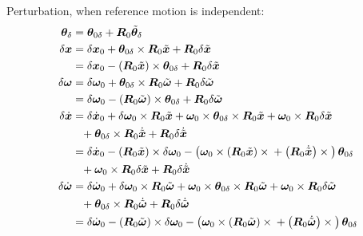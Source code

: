 \documentclass[10pt,fleqn,subeqn]{report}
\newcommand{\T}[1]{\bm{#1}}
\newcommand{\TT}[1]{\bm{#1}}
\begin{document}
Perturbation, when reference motion is independent:
\begin{subequations}
\begin{align}
	\T{\theta}_{\delta}
		&= \T{\theta}_{0\delta}
	+ \TT{R}_0 \tilde{\T{\theta}}_{\delta} \\
	\delta\T{x}
		&= \delta\T{x}_0
		+ \T{\theta}_{0\delta}\times\TT{R}_0 \tilde{\T{x}}
		+ \TT{R}_0 \delta\tilde{\T{x}}
		\nonumber \\
		&= \delta\T{x}_0
		- \plbr{\TT{R}_0 \tilde{\T{x}}} \times \T{\theta}_{0\delta}
		+ \TT{R}_0 \delta\tilde{\T{x}} \\
	\delta \T{\omega}
		&= \delta\T{\omega}_0
		+ \T{\theta}_{0\delta}\times\TT{R}_0 \tilde{\T{\omega}}
		+ \TT{R}_0 \delta\tilde{\T{\omega}}
		\nonumber \\
		&= \delta\T{\omega}_0
		- \plbr{\TT{R}_0 \tilde{\T{\omega}}} \times \T{\theta}_{0\delta}
		+ \TT{R}_0 \delta\tilde{\T{\omega}} \\
	\delta\dot{\T{x}}
		&= \delta\dot{\T{x}}_0
		+ \delta\T{\omega}_0 \times \TT{R}_0 \tilde{\T{x}}
		+ \T{\omega}_0 \times \T{\theta}_{0\delta}\times\TT{R}_0 \tilde{\T{x}}
		+ \T{\omega}_0 \times \TT{R}_0 \delta\tilde{\T{x}}
		\nonumber \\
		&\hphantom{=}+ \T{\theta}_{0\delta}\times\TT{R}_0 \dot{\tilde{\T{x}}}
		+ \TT{R}_0 \delta\dot{\tilde{\T{x}}}
		\nonumber \\
		&= \delta\dot{\T{x}}_0
		- \plbr{\TT{R}_0 \tilde{\T{x}}} \times \delta\T{\omega}_0
		- \plbr{
			\T{\omega}_0 \times \plbr{\TT{R}_0 \tilde{\T{x}}} \times{}
			+ \plbr{\TT{R}_0 \dot{\tilde{\T{x}}}}\times{}
		}\T{\theta}_{0\delta}
		\nonumber \\
		&\hphantom{=}+ \T{\omega}_0 \times \TT{R}_0 \delta\tilde{\T{x}}
		+ \TT{R}_0 \delta\dot{\tilde{\T{x}}} \\
	\delta\dot{\T{\omega}}
		&= \delta\dot{\T{\omega}}_0
		+ \delta\T{\omega}_0 \times \TT{R}_0 \tilde{\T{\omega}}
		+ \T{\omega}_0 \times \T{\theta}_{0\delta}\times\TT{R}_0 \tilde{\T{\omega}}
		+ \T{\omega}_0 \times \TT{R}_0 \delta\tilde{\T{\omega}}
		\nonumber \\
		&\hphantom{=}+ \T{\theta}_{0\delta}\times\TT{R}_0 \dot{\tilde{\T{\omega}}}
		+ \TT{R}_0 \delta\dot{\tilde{\T{\omega}}}
		\nonumber \\
		&= \delta\dot{\T{\omega}}_0
		- \plbr{\TT{R}_0 \tilde{\T{\omega}}} \times \delta\T{\omega}_0
		- \plbr{
			\T{\omega}_0 \times \plbr{\TT{R}_0 \tilde{\T{\omega}}}\times{}
			+ \plbr{\TT{R}_0 \dot{\tilde{\T{\omega}}}}\times{}
		}\T{\theta}_{0\delta}

\end{align}
\end{subequations}
\end{document}
